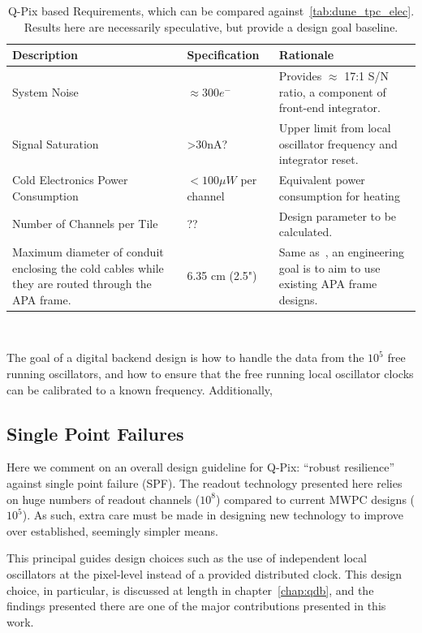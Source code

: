 \begin{table}
\begin{center}
\begin{tabular}{|| p{50mm} | p{50mm} | p{50mm} ||}
 \hline
 Description & Specification & Rationale \\ [0.5ex]
 \hline\hline
  System Noise & $\approx 300 e^{-}$ & Provides $\approx$ 17:1 S/N ratio, a component of front-end integrator. \\
 \hline
  Signal Saturation & >30\unit{nA}? & Upper limit from local oscillator frequency and integrator reset. \\
 \hline
  Cold Electronics Power Consumption &  $< 100 \unit{\mu W}$ per channel & Equivalent power consumption for heating \\
 \hline
  Number of Channels per Tile & ?? &  Design parameter to be calculated. \\
 \hline
  Maximum diameter of conduit enclosing the cold cables while they are routed through the APA frame. & 6.35 cm (2.5") & Same as~\citep{DUNE-FD_TDRv4:Abi_2020}, an engineering goal is to aim to use existing APA frame designs. \\
 \hline
\end{tabular}
\caption{Q-Pix based Requirements, which can be compared against~\ref{tab:dune_tpc_elec}. Results here are necessarily speculative, but provide a design goal baseline.}
\end{center}
\end{table}~\label{tab:qpix_tpc_elec}

The goal of a digital backend design is how to handle the data from the $10^{5}$ free running oscillators, and how to ensure that the free running local oscillator clocks can be calibrated to a known frequency.
Additionally,

\subsection{Single Point Failures}

Here we comment on an overall design guideline for Q-Pix: ``robust resilience'' against single point failure (SPF).
The readout technology presented here relies on huge numbers of readout channels ($10^{8}$) compared to current MWPC designs ($10^{5}$).
As such, extra care must be made in designing new technology to improve over established, seemingly simpler means.

This principal guides design choices such as the use of independent local oscillators at the pixel-level instead of a provided distributed clock.
This design choice, in particular, is discussed at length in chapter~\ref{chap:qdb}, and the findings presented there are one of the major contributions presented in this work.

